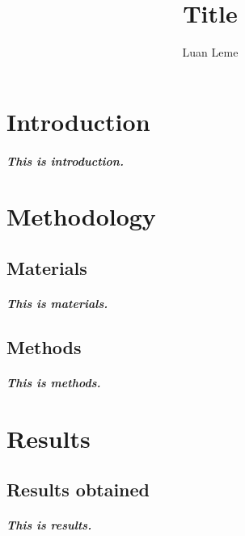 \documentclass[11pt, a4paper]{article}
\title{Title}
\author{Luan Leme}
\begin{document}
\maketitle

\chapter{Introduction}

\paragraph{This is introduction.}

\chapter{Methodology}

\section{Materials}

\paragraph{This is materials.}

\section{Methods}

\paragraph{This is methods.}

\chapter{Results}

\section{Results obtained}

\paragraph{This is results.}
\end{document}
